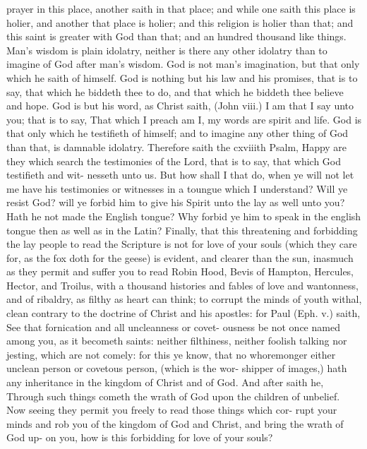\documentclass{custom}
\begin{document}
prayer in this place, another saith in that place;
and while one saith this place is holier, and 
another that place is holier; and this religion is 
holier than that; and this saint is greater with 
God than that; and an hundred thousand like 
things. Man's wisdom is plain idolatry, neither 
is there any other idolatry than to imagine of God 
after man's wisdom. God is not man's imagination, 
but that only which he saith of himself. God is 
nothing but his law and his promises, that is to say, 
that which he biddeth thee to do, and that which 
he biddeth thee believe and hope. God is but his 
word, as Christ saith, (John viii.) I am that I say 
unto you; that is to say, That which I preach am 
I, my words are spirit and life. God is that only 
which he testifieth of himself; and to imagine any 
other thing of God than that, is damnable idolatry. 
Therefore saith the cxviiith Psalm, Happy are 
they which search the testimonies of the Lord, 
that is to say, that which God testifieth and wit- 
nesseth unto us. But how shall I that do, when ye 
will not let me have his testimonies or witnesses 
in a toungue which I understand? Will ye resist 
God? will ye forbid him to give his Spirit unto 
the lay as well unto you? Hath he not made the 
English tongue? Why forbid ye him to speak in 
the english tongue then as well as in the Latin?
Finally, that this threatening and forbidding the 
lay people to read the Scripture is not for love of 
your souls (which they care for, as the fox doth 
for the geese) is evident, and clearer than the 
sun, inasmuch as they permit and suffer you to read 
Robin Hood, Bevis of Hampton, Hercules, Hector, 
and Troilus, with a thousand histories and fables of 
love and wantonness, and of ribaldry, as filthy as 
heart can think; to corrupt the minds of youth 
withal, clean contrary to the doctrine of Christ 
and his apostles: for Paul (Eph. v.) saith, See 
that fornication and all uncleanness or covet- 
ousness be not once named among you, as it 
becometh saints: neither filthiness, neither foolish 
talking nor jesting, which are not comely: for 
this ye know, that no whoremonger either unclean 
person or covetous person, (which is the wor- 
shipper of images,) hath any inheritance in the 
kingdom of Christ and of God. And after saith 
he, Through such things cometh the wrath of God 
upon the children of unbelief. Now seeing they 
permit you freely to read those things which cor- 
rupt your minds and rob you of the kingdom of 
God and Christ, and bring the wrath of God up- 
on you, how is this forbidding for love of your 
souls?
\end{document}
